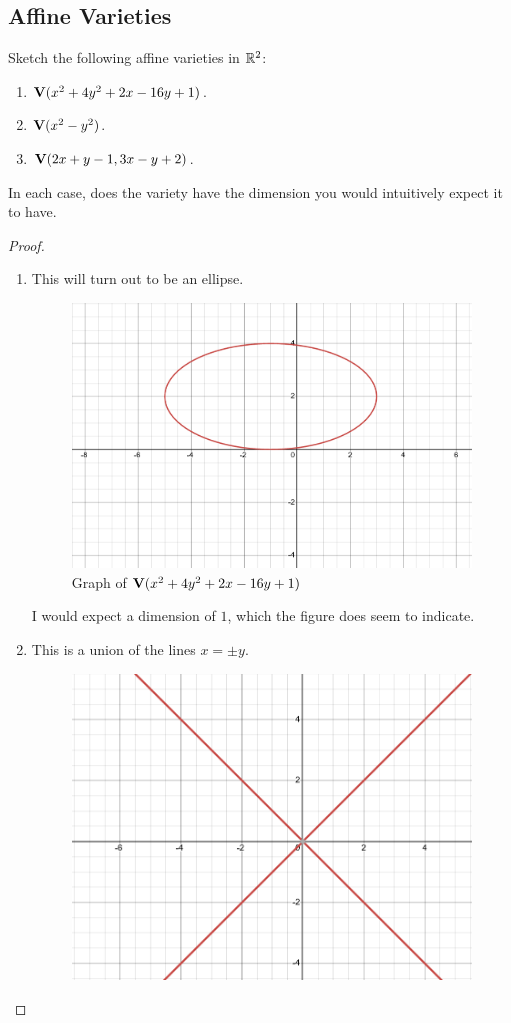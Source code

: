 \subsection{Affine Varieties}


\begin{exercise}{1}
Sketch the following affine varieties in $\mathbb{R}^2$:
\begin{enumerate}
    \item $\mathbf{V}(x^2 + 4y^2 + 2x - 16y + 1)$.
    \item $\mathbf{V}(x^2 - y^2)$.
    \item $\mathbf{V}(2x+y-1, 3x - y + 2)$.
\end{enumerate}
In each case, does the variety have the dimension you would intuitively expect it to have.
\end{exercise}
\begin{proof}
    \begin{enumerate}
        \item This will turn out to be an ellipse.
        \begin{figure}[H]
            \centering
            \includegraphics[width=0.5\linewidth]{cox-little-oshea/assets/sec1-2-ex1a.png}
     \caption{Graph of $\mathbf{V}(x^2 + 4y^2 + 2x - 16y + 1)$}
     \label{fig:sec1-2-ex1a}
        \end{figure}
        I would expect a dimension of $1$, which the figure does seem to indicate.
        \item This is a union of the lines $x=\pm y$.
        \begin{figure}[H]
            \centering
            \includegraphics[width=0.5\linewidth]{kreyszig/assets/sec1-2-ex1b.png}

\end{figure}
\end{enumerate}
\end{proof}
